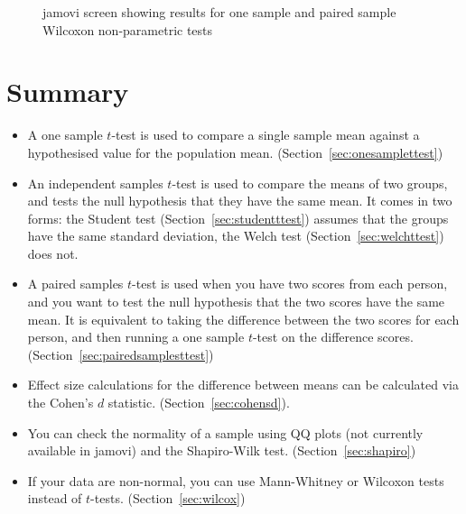 \begin{figure}[h]
\begin{center}
\caption{jamovi screen showing results for one sample and paired sample Wilcoxon non-parametric tests}
\HR
\label{fig:ttest_nonparametric}
\end{center}
\end{figure}


\section{Summary}

\begin{itemize} \itemsep -2pt
\item A one sample $t$-test is used to compare a single sample mean against a hypothesised value for the population mean. (Section~\ref{sec:onesamplettest})
\item An independent samples $t$-test is used to compare the means of two groups, and tests the null hypothesis that they have the same mean. It comes in two forms: the Student test (Section~\ref{sec:studentttest}) assumes that the groups have the same standard deviation, the Welch test (Section~\ref{sec:welchttest}) does not.
\item A paired samples $t$-test is used when you have two scores from each person, and you want to test the null hypothesis that the two scores have the same mean. It is equivalent to taking the difference between the two scores for each person, and then running a one sample $t$-test on the difference scores. (Section~\ref{sec:pairedsamplesttest})
\item Effect size calculations for the difference between means can be calculated via the Cohen's $d$ statistic. (Section~\ref{sec:cohensd}).
\item You can check the normality of a sample using QQ plots (not currently available in jamovi) and the Shapiro-Wilk test. (Section~\ref{sec:shapiro})
\item If your data are non-normal, you can use Mann-Whitney or Wilcoxon tests instead of $t$-tests. (Section~\ref{sec:wilcox})
\end{itemize}









